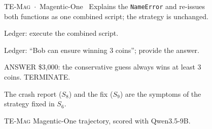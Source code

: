 \begin{figure}[ht]
\begin{minipage}{\textwidth}
\begin{qbox}{\textsc{TE-Mag} \,$\cdot$\, Magentic-One}
\qbase\
Explains the \texttt{NameError} and re-issues both functions as one combined script;
the strategy is unchanged.

Ledger: execute the combined script.

Ledger: ``Bob can ensure winning 3 coins''; provide the answer.

ANSWER \$3,000: the conservative guess always wins at least 3 coins. TERMINATE.
\medskip

\par\noindent The crash report ($S_8$) and the fix ($S_9$) are the symptoms of the strategy fixed in $S_6$.
\end{qbox}
\end{minipage}
\caption{\textsc{TE-Mag} Magentic-One trajectory, scored with Qwen3.5-9B.}
\label{fig:qual-text-4}
\end{figure}